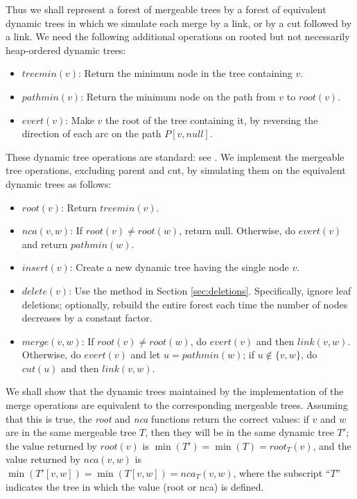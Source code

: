 \documentclass[twoside,leqno,twocolumn]{article}
\newcommand{\merge}{\mathit{merge}}
\newcommand{\nca}{\mathit{nca}}
\newcommand{\nul}{\mathit{null}}
\newcommand{\rootn}{\mathit{root}}
\newcommand{\treemin}{\mathit{treemin}}
\newcommand{\pathmin}{\mathit{pathmin}}
\begin{document}
Thus we shall represent a forest of mergeable trees by a forest of equivalent dynamic trees in which we simulate each merge by a link, or by a cut followed by a link.  We need the following additional operations on rooted but not necessarily heap-ordered dynamic trees:
\begin{itemize}
\item $\mathit{treemin}(v)$: Return the minimum node in the tree containing $v$.
\item $\mathit{pathmin}(v)$: Return the minimum node on the path from $v$ to $\rootn(v)$.
\item $\mathit{evert}(v)$: Make $v$ the root of the tree containing it, by reversing the direction of each arc on the path $P[v, \nul]$.
\end{itemize}
These dynamic tree operations are standard: see \cite{AHTdL05,GGT91,ST83,ST85,TW05}.  We implement the mergeable tree operations, excluding parent and cut, by simulating them on the equivalent dynamic trees  as follows:
\begin{itemize}
\item $\rootn(v)$: Return $\treemin(v)$.
\item $\nca(v, w)$: If $\rootn(v) \neq \rootn(w)$, return null. Otherwise, do $\mathit{evert}(v)$ and return $\pathmin(w)$.
\item $\mathit{insert}(v)$: Create a new dynamic tree having the single node $v$.
\item $\mathit{delete}(v)$: Use the method in Section \ref{sec:deletions}.  Specifically, ignore leaf deletions; optionally, rebuild the entire forest each time the number of nodes decreases by a constant factor.
\item $\merge(v, w)$: If $\rootn(v) \neq \rootn(w)$, do $\mathit{evert}(v)$ and then $\mathit{link}(v, w)$. Otherwise, do $\mathit{evert}(v)$ and let $u=\pathmin(w)$; if $u \not\in \{v, w\}$, do $\mathit{cut}(u)$ and then $\mathit{link}(v, w)$.
\end{itemize}
We shall show that the dynamic trees maintained by the implementation of the merge operations are equivalent to the corresponding mergeable trees.  Assuming that this is true, the \emph{root} and \emph{nca} functions return the correct values: if $v$ and $w$ are in the same  mergeable tree $T$, then they will be in the same dynamic tree $T'$; the value returned by $\rootn(v)$  is $\min(T') = \min(T) = \rootn_{T}(v)$, and the value returned by $\nca(v, w)$ is $\min(T'[v, w]) = \min(T[v, w]) = \nca_{T}(v, w)$, where the subscript ``$T$'' indicates the tree in which the value (root or nca) is defined.
\end{document}
